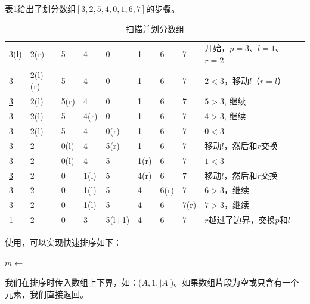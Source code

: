 \documentclass[b5paper]{ctexart}
\begin{document}
表\cref{tab:partition-steps}给出了划分数组$[3, 2, 5, 4, 0, 1, 6, 7]$的步骤。

\begin{table}[htbp]
\centering
\begin{tabular}{|llllllll|l|}
\hline
\underline{3}(l)  & 2(r) & 5 & 4 & 0 & 1 & 6 & 7 & 开始，$p = 3$、$l = 1$、$r = 2$ \\
\underline{3} & 2(l)(r) & 5 & 4 & 0 & 1 & 6 & 7 & $2 < 3$，移动$l$（$r=l$）\\
\underline{3} & 2(l) & 5(r) & 4 & 0 & 1 & 6 & 7 & $5 > 3$, 继续 \\
\underline{3} & 2(l) & 5 & 4(r) & 0 & 1 & 6 & 7 & $4 > 3$, 继续 \\
\underline{3} & 2(l) & 5 & 4 & 0(r) & 1 & 6 & 7 & $0 < 3$ \\
\underline{3} & 2 & 0(l) & 4 & 5(r) & 1 & 6 & 7 & 移动$l$，然后和$r$交换 \\
\underline{3} & 2 & 0(l) & 4 & 5 & 1(r) & 6 & 7 & $1 < 3$ \\
\underline{3} & 2 & 0 & 1(l) & 5 & 4(r) & 6 & 7 & 移动$l$，然后和$r$交换 \\
\underline{3} & 2 & 0 & 1(l) & 5 & 4 & 6(r) & 7 & $6 > 3$，继续 \\
\underline{3} & 2 & 0 & 1(l) & 5 & 4 & 6 & 7(r) & $7 > 3$，继续 \\
1 & 2 & 0 & 3 & 5(l+1) & 4 & 6 & 7 & $r$越过了边界，交换$p$和$l$ \\
\hline
\end{tabular}
\caption{扫描并划分数组} \label{tab:partition-steps}
\end{table}

使用，可以实现快速排序如下：

\begin{algorithmic}[1]
    \State $m \gets$ 
    \State {}
    \State {}
  \EndIf
\EndProcedure
\end{algorithmic}

我们在排序时传入数组上下界，如：($A, 1, |A|$)。如果数组片段为空或只含有一个元素，我们直接返回。

\begin{Exercise}\label{ex:basic-qsort}
\end{Exercise}

\begin{Answer}[ref = {ex:basic-qsort}]
\end{Answer}
\end{document}
